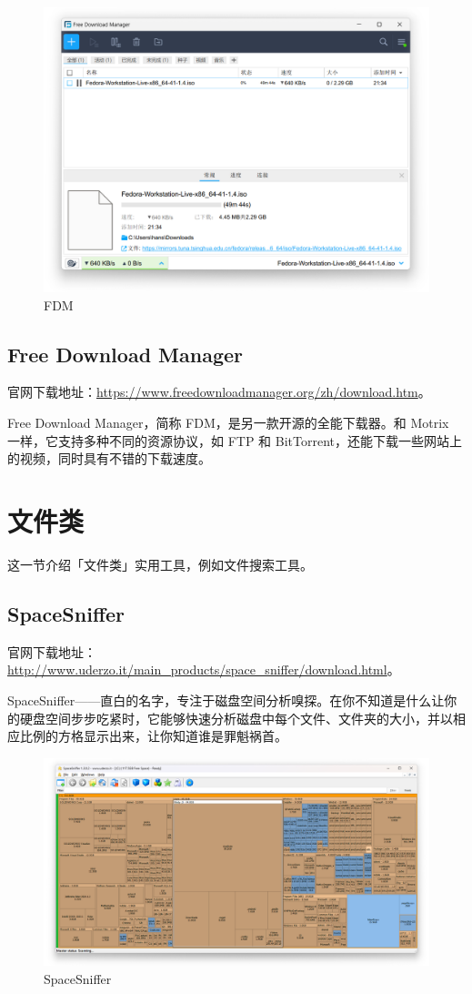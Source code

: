 \begin{figure}[htb!]
  \centering
  \includegraphics[width=.65\textwidth]{assets/software/FDM.png}
  \caption{FDM}
  \label{fig:FDM}
\end{figure}

\subsection{Free Download Manager}

官网下载地址：\url{https://www.freedownloadmanager.org/zh/download.htm}。

Free Download Manager，简称 FDM，是另一款开源的全能下载器。和 Motrix 一样，它支持多种不同的资源协议，如 FTP 和 BitTorrent，还能下载一些网站上的视频，同时具有不错的下载速度。

\section{文件类}

这一节介绍「文件类」实用工具，例如文件搜索工具。

\vspace*{-.5cm}
\subsection{SpaceSniffer}

官网下载地址：\url{http://www.uderzo.it/main_products/space_sniffer/download.html}。

SpaceSniffer——直白的名字，专注于磁盘空间分析嗅探。在你不知道是什么让你的硬盘空间步步吃紧时，它能够快速分析磁盘中每个文件、文件夹的大小，并以相应比例的方格显示出来，让你知道谁是罪魁祸首。

\begin{figure}[htb!]
  \centering
  \includegraphics[width=.8\textwidth]{assets/software/SpaceSniffer.png}
  \caption{SpaceSniffer}
  \label{fig:SpaceSniffer}
\end{figure}


